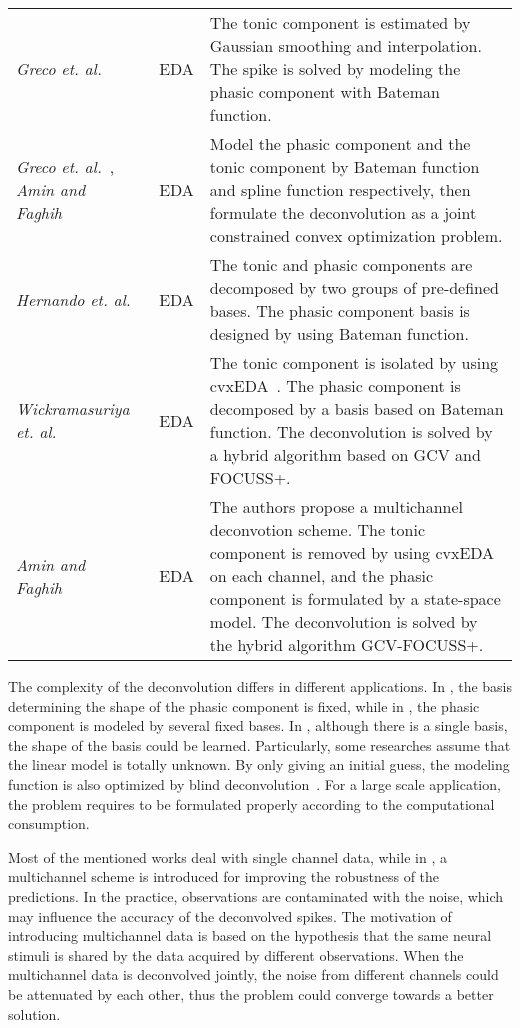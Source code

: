 \documentclass[10pt,conference]{ieeeconf}
\begin{document}
\begin{table*}[htbp]
\begin{tabular}{m{}<{\raggedright}m{}<{\raggedright}m{}}
    \textit{Greco et. al.}~\cite{greco2014electrodermal} & EDA & The tonic component is estimated by Gaussian smoothing and interpolation. The spike is solved by modeling the phasic component with Bateman function. \\ 
    \textit{Greco et. al.}~\cite{greco2015cvxeda}, \textit{Amin and Faghih}~\cite{amin2019tonic} & EDA & Model the phasic component and the tonic component by Bateman function and spline function respectively, then formulate the deconvolution as a joint constrained convex optimization problem. \\ 
    \textit{Hernando et. al.}~\cite{hernando2017feature} & EDA & The tonic and phasic components are decomposed by two groups of pre-defined bases. The phasic component basis is designed by using Bateman function. \\
    \textit{Wickramasuriya et. al.}~\cite{wickramasuriya2019skin} & EDA & The tonic component is isolated by using cvxEDA~\cite{greco2015cvxeda}. The phasic component is decomposed by a basis based on Bateman function. The deconvolution is solved by a hybrid algorithm based on GCV and FOCUSS+. \\
    \textit{Amin and Faghih}~\cite{amin2019robust} & EDA & The authors propose a multichannel deconvotion scheme. The tonic component is removed by using cvxEDA~\cite{greco2015cvxeda} on each channel, and the phasic component is formulated by a state-space model. The deconvolution is solved by the hybrid algorithm GCV-FOCUSS+. \\ \bottomrule
  \end{tabular}
\end{table*}

The complexity of the deconvolution differs in different applications. In \cite{greco2015cvxeda}, the basis determining the shape of the phasic component is fixed, while in \cite{hernando2017feature}, the phasic component is modeled by several fixed bases. In \cite{greco2014electrodermal,amin2019tonic,wickramasuriya2019skin,kazemipour2017fast,amin2019robust}, although there is a single basis, the shape of the basis could be learned. Particularly, some researches assume that the linear model is totally unknown. By only giving an initial guess, the modeling function is also optimized by blind deconvolution~\cite{kaur2016remote,friedrich2017fast}. For a large scale application, the problem requires to be formulated properly according to the computational consumption.

Most of the mentioned works deal with single channel data, while in \cite{friedrich2017fast,amin2019robust}, a multichannel scheme is introduced for improving the robustness of the predictions. In the practice, observations are contaminated with the noise, which may influence the accuracy of the deconvolved spikes. The motivation of introducing multichannel data is based on the hypothesis that the same neural stimuli is shared by the data acquired by different observations. When the multichannel data is deconvolved jointly, the noise from different channels could be attenuated by each other, thus the problem could converge towards a better solution.
\end{document}
